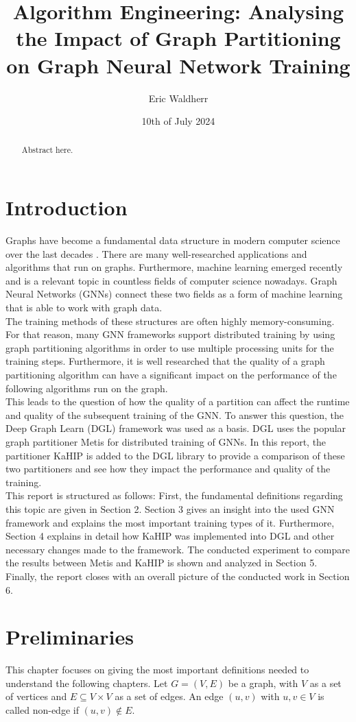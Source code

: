 \documentclass[acmsmall,nonacm,screen,review]{acmart}
\title{Algorithm Engineering: Analysing the Impact of Graph Partitioning on Graph Neural Network Training}
\author{Eric Waldherr}
\affiliation{%
  \institution{Heidelberg University}
  \streetaddress{Im Neuenheimer Feld 205}
  \city{Heidelberg}
  \state{Baden-Württemberg}
  \country{Germany}
  \postcode{69120}
}
\date{10th of July 2024}
\begin{document}
\begin{abstract}
Abstract here.
\end{abstract}
\maketitle

\section{Introduction}
Graphs have become a fundamental data structure in modern computer science over the last decades \cite{Junghanns2017}. There are many well-researched applications and algorithms that run on graphs. Furthermore, machine learning emerged recently and is a relevant topic in countless fields of computer science nowadays. Graph Neural Networks (GNNs) connect these two fields as a form of machine learning that is able to work with graph data. \\
The training methods of these structures are often highly memory-consuming. For that reason, many GNN frameworks support distributed training by using graph partitioning algorithms in order to use multiple processing units for the training steps. Furthermore, it is well researched that the quality of a graph partitioning algorithm can have a significant impact on the performance of the following algorithms run on the graph. \\
This leads to the question of how the quality of a partition can affect the runtime and quality of the subsequent training of the GNN. To answer this question, the Deep Graph Learn (DGL) framework \cite{DGL} was used as a basis. DGL uses the popular graph partitioner Metis \cite{Metis} for distributed training of GNNs. In this report, the partitioner KaHIP \cite{KaHIP} is added to the DGL library to provide a comparison of these two partitioners and see how they impact the performance and quality of the training. \\  
This report is structured as follows: First, the fundamental definitions regarding this topic are given in Section 2. Section 3 gives an insight into the used GNN framework and explains the most important training types of it. Furthermore, Section 4 explains in detail how KaHIP was implemented into DGL and other necessary changes made to the framework. The conducted experiment to compare the results between Metis and KaHIP is shown and analyzed in Section 5. Finally, the report closes with an overall picture of the conducted work in Section 6. 
\section{Preliminaries}
This chapter focuses on giving the most important definitions needed to understand the following chapters. Let $G=(V,E)$ be a graph, with $V$ as a set of vertices and $E \subseteq V \times V$ as a set of edges. An edge $(u,v)$ with $u,v \in V$ is called non-edge if $(u,v) \notin E$.
\end{document}

